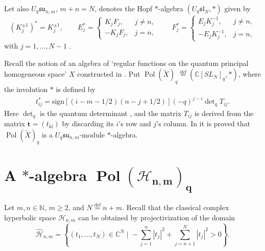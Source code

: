 Let also $U_q\mathfrak{su}_{n,m}$, $m+n=N$, denotes the Hopf $*$-algebra $(U_q \mathfrak{sl}_N,*)$ given by
\[
(K_j^{\pm 1})^*=K_j^{\pm 1},\qquad E_j^*=
\begin{cases}
K_jF_j,& j \ne n,
\\ -K_jF_j,& j=n,
\end{cases}\qquad F_j^*=
\begin{cases}
E_jK_j^{-1},& j \ne n,
\\ -E_jK_j^{-1},& j=n,
\end{cases}
\]
with $j=1,\ldots,N-1$ \cite{RTF, polmat}.

Recall the notion of an algebra of `regular functions on the quantum principal homogeneous space' $X$
constructed in \cite{polmat}. Put $\operatorname{Pol}(\widetilde{X})_q\overset{\mathrm{def}}{=}
(\mathbb{C}[SL_N]_q,*)$, where the involution $*$ is def\/ined by
\begin{gather}\label{def_inv}
t_{ij}^*=\mathrm{sign}[(i-m-1/2)(n-j+1/2)](-q)^{j-i}\det\nolimits_qT_{ij}.
\end{gather}
Here $\det_q$ is the quantum determinant \cite{Ch-P}, and the matrix $T_{ij}$ is derived from the matrix
$\mathbf{t}=(t_{kl})$ by discarding its $i$'s row and $j$'s column. In \cite{polmat} it is proved that
$\operatorname{Pol}(\widetilde{X})_q$ is a $U_{q}\mathfrak{su}_{n,m}$-module $*$-algebra.

\section[A $*$-algebra $\operatorname{Pol}(\mathscr{H}_{n,m})_{q}$]{A $\boldsymbol{*}$-algebra $\boldsymbol{\operatorname{Pol}(\mathscr{H}_{n,m})_{q}}$}\label{sec_2}

Let $m,n\in\mathbb{N}$, $m\ge 2$, and $N\overset{\mathrm{def}}{=}n+m$. Recall that the classical complex
hyperbolic space $\mathscr{H}_{n,m}$ can be obtained by projectivization of the domain
\[
\widehat{\mathscr{H}}_{n,m}=\left\{(t_1,\ldots,t_N)\in\mathbb{C}^N\; \Big|\;
-\sum^n_{j=1}|t_j|^2+\sum^N_{j=n+1}|t_{j}|^2>0 \right\}.
\]

